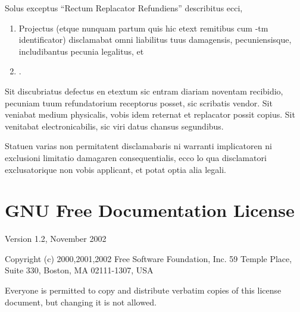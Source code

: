\medskip{}


Solus exceptus ``Rectum Replacator Refundiens'' describitus ecci,
\begin{enumerate}
\item Projectus (etque nunquam partum quis hic etext remitibus cum -tm identificator) disclamabat omni liabilitus tuus damagensis,
pecuniensisque, includibantus pecunia legalitus, et 
\item {}. 
\end{enumerate}
Sit discubriatus defectus en etextum sic entram diariam noventam recibidio,
pecuniam tuum refundatorium receptorus posset, sic scribatis vendor.
Sit veniabat medium physicalis, vobis idem reternat et replacator
possit copius. Sit venitabat electronicabilis, sic viri datus chansus
segundibus. 


Statuen varias non permitatent disclamabaris ni warranti implicatoren
ni exclusioni limitatio damagaren consequentialis, ecco lo qua disclamatori
exclusato\-rique non vobis applicant, et potat optia alia legali.

\twocolumn

\chapter{GNU Free Documentation License\label{sec:GFDL} }

{\footnotesize{}Version 1.2, November 2002}{\footnotesize\par}

{\tiny{}Copyright (c) 2000,2001,2002 Free Software Foundation, Inc.
59 Temple Place, Suite 330, Boston, MA 02111-1307, USA}{\tiny\par}

{\tiny{}Everyone is permitted to copy and distribute verbatim copies
of this license document, but changing it is not allowed.}{\tiny\par}

{\tiny{}\setcounter{subsection}{-1}}{\tiny\par}

